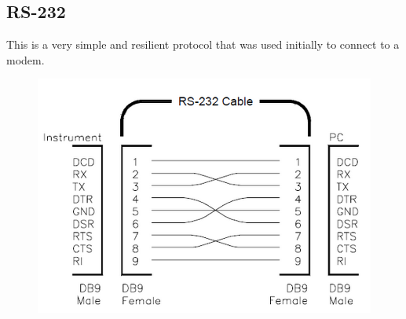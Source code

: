 \documentclass{hw}
\begin{document}
\subsection{RS-232}
This is a very simple and resilient protocol that was used initially to connect
to a modem.
\begin{figure}[H]
  \centering
  \includegraphics[scale=.6]{rs1}
\end{figure}
\end{document}
